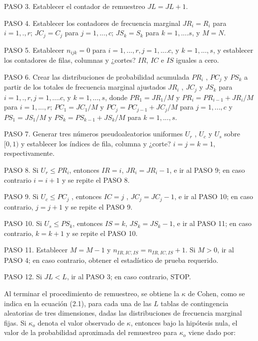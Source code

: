 \documentclass[12pt,a4paper,]{book}
\numberwithin{dummy}{section}
\theoremstyle{ocrenumbox}
\theoremstyle{blacknumex}
\theoremstyle{blacknumbox}
\theoremstyle{ocrenum}
\theoremstyle{ocrenum}
\begin{document}
PASO 3. Establecer el contador de remuestreo \(JL = JL + 1\).

PASO 4. Establecer los contadores de frecuencia marginal \(JR_i = R_i\)
para \(i = 1, . , r\); \(JC_j = C_j\) para \(j = 1, . . . , c\);
\(JS_k = S_k\) para \(k = 1, . . . . s\), y \(M = N\).

PASO 5. Establecer \(n_{ijk} = 0\) para
\(i = 1, . . . , r, j = 1, . . . . c\), y \(k = 1, . . . , s\), y
establecer los contadores de filas, columnas y ¿cortes? \(IR\), \(IC\) e
\(IS\) iguales a cero.

PASO 6. Crear las distribuciones de probabilidad acumulada \(PR_i\) ,
\(PC_j\) y \(PS_k\) a partir de los totales de frecuencia marginal
ajustados \(JR_i\) , \(JC_j\) y \(JS_k\) para
\(i = 1, . , r, j = 1, . . . . c\), y \(k = 1, . . . , s\), donde
\(PR_1 = JR_1/M\) y \(PR_i = PR_{i-1} + JR_i/M\) para
\(i = 1, . . . , r\); \(PC_1 = JC_1/M\) y \(PC_j = PC_{j-1} + JC_j/M\)
para \(j = 1, . . . , c\) y \(PS_1 = JS_1/M\) y
\(PS_k = PS_{k-1} + JS_k/M\) para \(k = 1, . . . , s\).

PASO 7. Generar tres números pseudoaleatorios uniformes \(U_r\) ,
\(U_c\) y \(U_s\) sobre \([0, 1)\) y establecer los índices de fila,
columna y ¿corte? \(i = j = k = 1\), respectivamente.

PASO 8. Si \(U_r \le PR_i\), entonces \(IR = i\), \(JR_i = JR_i - 1\), e
ir al PASO 9; en caso contrario \(i = i + 1\) y se repite el PASO 8.

PASO 9. Si \(U_c \le PC_j\) , entonces \(IC = j\) , \(JC_j = JC_j-1\), e
ir al PASO 10; en caso contrario, \(j = j + 1\) y se repite el PASO 9.

PASO 10. Si \(U_s \le PS_k\), entonces \(IS = k\), \(JS_k = JS_k -1\), e
ir al PASO 11; en caso contrario, \(k = k + 1\) y se repite el PASO 10.

PASO 11. Establecer \(M = M - 1\) y \(n_{IR,IC,IS} = n_{IR,IC,IS} + 1\).
Si \(M >0\), ir al PASO 4; en caso contrario, obtener el estadístico de
prueba requerido.

PASO 12. Si \(JL < L\), ir al PASO 3; en caso contrario, STOP.

Al terminar el procedimiento de remuestreo, se obtiene la \(\kappa\) de
Cohen, como se indica en la ecuación (2.1), para cada una de las \(L\)
tablas de contingencia aleatorias de tres dimensiones, dadas las
distribuciones de frecuencia marginal fijas. Si \(\kappa_o\) denota el
valor observado de \(\kappa\), entonces bajo la hipótesis nula, el valor
de la probabilidad aproximada del remuestreo para \(\kappa_o\) viene
dado por:
\end{document}
